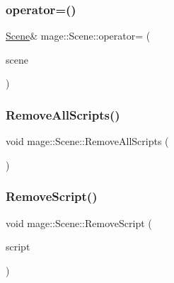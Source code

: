 \subsubsection{\texorpdfstring{operator=()}{operator=()}\hspace{0.1cm}{\footnotesize\ttfamily [2/2]}}
{\footnotesize\ttfamily \hyperlink{classmage_1_1_scene}{Scene}\& mage\+::\+Scene\+::operator= (\begin{DoxyParamCaption}\item[{\hyperlink{classmage_1_1_scene}{Scene} \&\&}]{scene }\end{DoxyParamCaption})\hspace{0.3cm}{\ttfamily [delete]}}

\hypertarget{classmage_1_1_scene_a04b6e0b4d9ca18d15d3da098e581d336}{}\label{classmage_1_1_scene_a04b6e0b4d9ca18d15d3da098e581d336} 
\subsubsection{\texorpdfstring{Remove\+All\+Scripts()}{RemoveAllScripts()}}
{\footnotesize\ttfamily void mage\+::\+Scene\+::\+Remove\+All\+Scripts (\begin{DoxyParamCaption}{ }\end{DoxyParamCaption})}

\hypertarget{classmage_1_1_scene_a82705ba56543dea410439760b1667bc5}{}\label{classmage_1_1_scene_a82705ba56543dea410439760b1667bc5} 
\subsubsection{\texorpdfstring{Remove\+Script()}{RemoveScript()}}
{\footnotesize\ttfamily void mage\+::\+Scene\+::\+Remove\+Script (\begin{DoxyParamCaption}\item[{\hyperlink{namespacemage_a1e01ae66713838a7a67d30e44c67703e}{Shared\+Ptr}$<$ \hyperlink{classmage_1_1_behavior_script}{Behavior\+Script} $>$}]{script }\end{DoxyParamCaption})}

\hypertarget{classmage_1_1_scene_a53487349d68f0ffcc91b243d0cfb86a3}{}\label{classmage_1_1_scene_a53487349d68f0ffcc91b243d0cfb86a3} 
